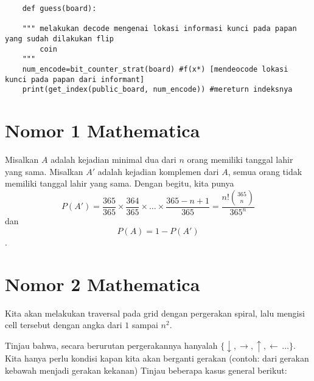 \documentclass[12pt,letterpaper]{article}
\begin{document}
\begin{lstlisting}
    def guess(board):

    """ melakukan decode mengenai lokasi informasi kunci pada papan yang sudah dilakukan flip
        coin
    """
    num_encode=bit_counter_strat(board) #f(x*) [mendeocode lokasi kunci pada papan dari informant]
    print(get_index(public_board, num_encode)) #mereturn indeksnya
\end{lstlisting}

\break

\section{Nomor 1 Mathematica}
Misalkan $A$ adalah kejadian minimal dua dari $n$ orang memiliki tanggal lahir yang sama.
Misalkan $A'$ adalah kejadian komplemen dari $A$, semua orang tidak memiliki tanggal lahir yang sama.
Dengan begitu, kita punya $$P(A')=\frac{365}{365}\times\frac{364}{365}\times\dots\times \frac{365-n+1}{365}= \frac{n! \binom{365}{n}}{365^n}$$
dan $$P(A)=1-P(A')$$.


\section{Nomor 2 Mathematica}
Kita akan melakukan traversal pada grid dengan pergerakan spiral, 
lalu mengisi cell tersebut dengan angka dari $1$ sampai $n^2$.

Tinjau bahwa, secara berurutan pergerakannya hanyalah $\{\downarrow, \rightarrow, \uparrow, \leftarrow\, \dots\}$.
Kita hanya perlu kondisi kapan kita akan berganti gerakan (contoh: dari gerakan kebawah menjadi gerakan kekanan)
Tinjau beberapa kasus general berikut:
\end{document}
